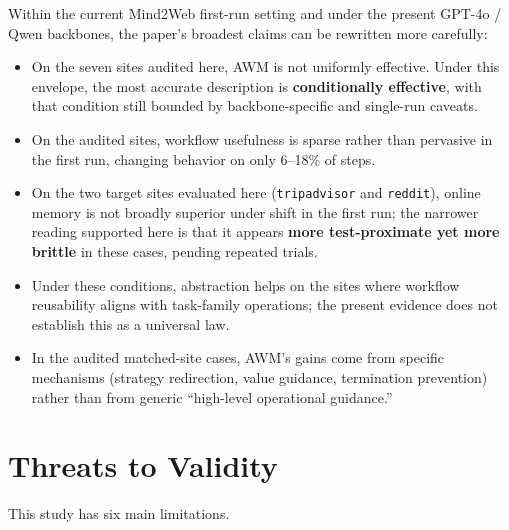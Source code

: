 \documentclass{article}
\providecommand{\tightlist}{%
  \setlength{\itemsep}{0pt}\setlength{\parskip}{0.8em}}
\begin{document}
Within the current Mind2Web first-run setting and under the present
GPT-4o / Qwen backbones, the paper's broadest claims can be
rewritten more carefully:

\begin{itemize}
\tightlist
\item
  On the seven sites audited here, AWM is not uniformly effective.
  Under this envelope, the most accurate description is
  \textbf{conditionally effective}, with that condition still bounded
  by backbone-specific and single-run caveats.
\item
  On the audited sites, workflow usefulness is sparse rather than
  pervasive in the first run, changing behavior on only 6--18\% of
  steps.
\item
  On the two target sites evaluated here (\texttt{tripadvisor} and
  \texttt{reddit}), online memory is not broadly superior under shift
  in the first run; the narrower reading supported here is that it
  appears \textbf{more test-proximate yet more brittle} in these
  cases, pending repeated trials.
\item
  Under these conditions, abstraction helps on the sites where
  workflow reusability aligns with task-family operations; the
  present evidence does not establish this as a universal law.
\item
  In the audited matched-site cases, AWM's gains come from specific
  mechanisms (strategy redirection, value guidance, termination
  prevention) rather than from generic ``high-level operational
  guidance.''
\end{itemize}

\section{Threats to Validity}\label{threats-to-validity}

This study has six main limitations.
\end{document}
